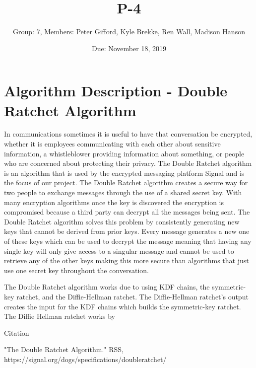 \documentclass{article}
\title{P-4}
\author{Group: 7, Members: Peter Gifford, Kyle Brekke, Ren Wall, Madison Hanson}
\date{Due: November 18, 2019}
\begin{document}
\maketitle

\section{Algorithm Description - Double Ratchet Algorithm}

In communications sometimes it is useful to have that conversation be encrypted, whether it is employees communicating with each other about sensitive information, a whistleblower providing information about something, or people who are concerned about protecting their privacy. The Double Ratchet algorithm is an algorithm that is used by the encrypted messaging platform Signal and is the focus of our project. The Double Ratchet algorithm creates a secure way for two people to exchange messages through the use of a shared secret key. With many encryption algorithms once the key is discovered the encryption is compromised because a third party can decrypt all the messages being sent. The Double Ratchet algorithm solves this problem by consistently generating new keys that cannot be derived from prior keys. Every message generates a new one of these keys which can be used to decrypt the message meaning that having any single key will only give access to a singular message and cannot be used to retrieve any of the other keys making this more secure than algorithms that just use one secret key throughout the conversation. 

The Double Ratchet algorithm works due to using KDF chains, the symmetric-key ratchet, and the Diffie-Hellman ratchet. The Diffie-Hellman ratchet's output creates the input for the KDF chains which builds the symmetric-key ratchet. The Diffie Hellman ratchet works by



    
Citation

"The Double Ratchet Algorithm." RSS, https://signal.org/dogs/specifications/doubleratchet/


    
	
	    
\end{document}
